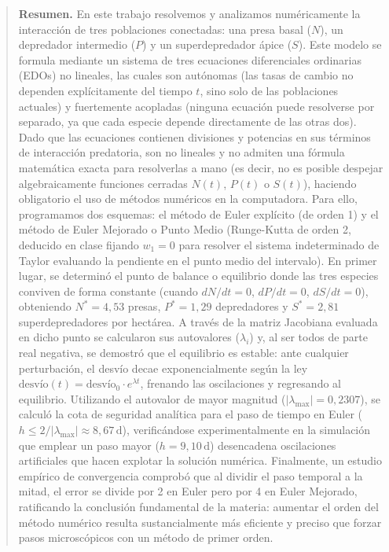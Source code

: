 \documentclass[10pt,twocolumn,a4paper]{article}
\begin{document}
  \begin{quotation}
    \footnotesize\noindent\textbf{Resumen.} En este trabajo resolvemos y analizamos numéricamente la interacción de tres poblaciones conectadas: una presa basal ($N$), un depredador intermedio ($P$) y un superdepredador ápice ($S$). Este modelo se formula mediante un sistema de tres ecuaciones diferenciales ordinarias (EDOs) no lineales, las cuales son autónomas (las tasas de cambio no dependen explícitamente del tiempo $t$, sino solo de las poblaciones actuales) y fuertemente acopladas (ninguna ecuación puede resolverse por separado, ya que cada especie depende directamente de las otras dos). Dado que las ecuaciones contienen divisiones y potencias en sus términos de interacción predatoria, son no lineales y no admiten una fórmula matemática exacta para resolverlas a mano (es decir, no es posible despejar algebraicamente funciones cerradas $N(t)$, $P(t)$ o $S(t)$), haciendo obligatorio el uso de métodos numéricos en la computadora. Para ello, programamos dos esquemas: el método de Euler explícito (de orden 1) y el método de Euler Mejorado o Punto Medio (Runge-Kutta de orden 2, deducido en clase fijando $w_1 = 0$ para resolver el sistema indeterminado de Taylor evaluando la pendiente en el punto medio del intervalo). En primer lugar, se determinó el punto de balance o equilibrio donde las tres especies conviven de forma constante (cuando $dN/dt = 0$, $dP/dt = 0$, $dS/dt = 0$), obteniendo $N^* = 4{,}53$ presas, $P^* = 1{,}29$ depredadores y $S^* = 2{,}81$ superdepredadores por hectárea. A través de la matriz Jacobiana evaluada en dicho punto se calcularon sus autovalores ($\lambda_i$) y, al ser todos de parte real negativa, se demostró que el equilibrio es estable: ante cualquier perturbación, el desvío decae exponencialmente según la ley $\text{desvío}(t) = \text{desvío}_0 \cdot e^{\lambda t}$, frenando las oscilaciones y regresando al equilibrio. Utilizando el autovalor de mayor magnitud ($|\lambda_{\max}| = 0{,}2307$), se calculó la cota de seguridad analítica para el paso de tiempo en Euler ($h \le 2/|\lambda_{\max}| \approx 8{,}67\,\text{d}$), verificándose experimentalmente en la simulación que emplear un paso mayor ($h = 9{,}10\,\text{d}$) desencadena oscilaciones artificiales que hacen explotar la solución numérica. Finalmente, un estudio empírico de convergencia comprobó que al dividir el paso temporal a la mitad, el error se divide por 2 en Euler pero por 4 en Euler Mejorado, ratificando la conclusión fundamental de la materia: aumentar el orden del método numérico resulta sustancialmente más eficiente y preciso que forzar pasos microscópicos con un método de primer orden.

\end{quotation}
\end{document}

